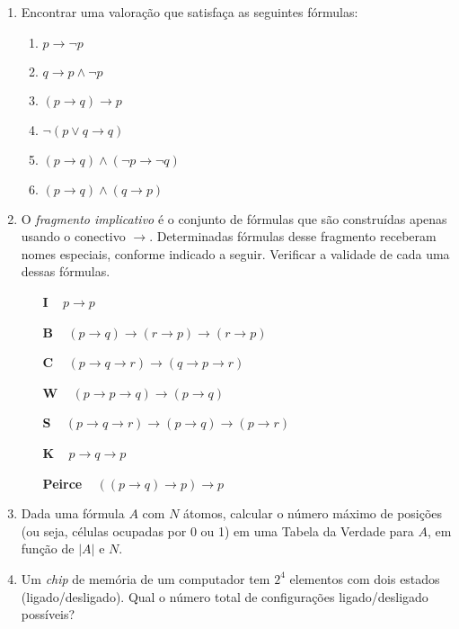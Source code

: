 \documentclass[12pt,a4paper,oneside]{article}
\begin{document}
\begin{enumerate}
	\item Encontrar uma valoração que satisfaça as seguintes fórmulas:
	
		\begin{enumerate}
			\item $p \rightarrow \neg p$
			\item $q \rightarrow p \wedge \neg p$
			\item $(p \rightarrow q) \rightarrow p$
			\item $\neg(p \vee q \rightarrow q)$
			\item $(p \rightarrow q) \wedge (\neg p \rightarrow \neg q)$
			\item $(p \rightarrow q) \wedge (q \rightarrow p)$
		\end{enumerate}
		
	\item O {\it fragmento implicativo} é o conjunto de fórmulas que são construídas apenas usando o conectivo $\rightarrow$. Determinadas fórmulas desse fragmento receberam nomes especiais, conforme indicado a seguir. Verificar a validade de cada uma dessas fórmulas.
	
		\begin{enumerate}
			\item[\bf I] \mbox{ } $p \rightarrow p$
			\item[\bf B] \mbox{ } $(p \rightarrow q) \rightarrow (r \rightarrow p) \rightarrow (r \rightarrow p)$
			\item[\bf C] \mbox{ } $(p \rightarrow q \rightarrow r) \rightarrow (q \rightarrow p \rightarrow r)$
			\item[\bf W] \mbox{ } $(p \rightarrow p \rightarrow q) \rightarrow (p \rightarrow q)$
			\item[\bf S] \mbox{ } $(p \rightarrow q \rightarrow r) \rightarrow (p \rightarrow q) \rightarrow (p \rightarrow r)$
			\item[\bf K] \mbox{ } $p \rightarrow q \rightarrow p$
	   \item[\bf Peirce] \mbox{ } $((p \rightarrow q) \rightarrow p) \rightarrow p$
		\end{enumerate}	
	
	\item Dada uma fórmula $A$ com $N$ átomos, calcular o número máximo de posições (ou seja, células ocupadas por 0 ou 1) em uma Tabela da Verdade para $A$, em função de $|A|$ e $N$.
	
	\item Um {\it chip} de memória de um computador tem $2^4$ elementos com dois estados (ligado/desligado). Qual o número total de configurações ligado/desligado possíveis?
	

\end{enumerate}
\end{document}
